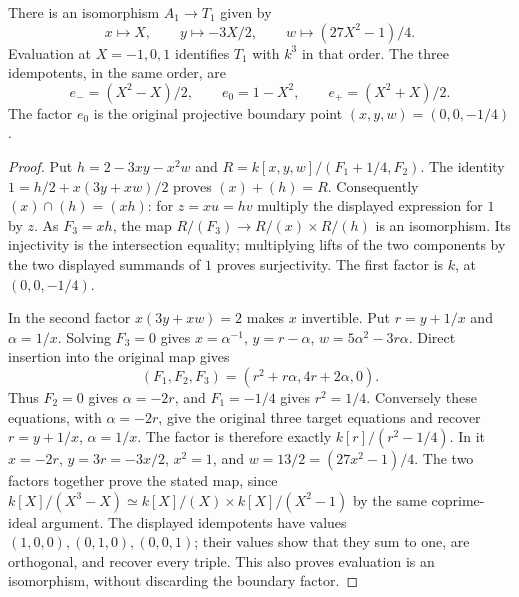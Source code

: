\begin{proposition}\label{prop:sv-full-fibre}
There is an isomorphism $A_1\longrightarrow T_1$ given by
\[
 x\longmapsto X,\qquad y\longmapsto-3X/2,\qquad
 w\longmapsto(27X^2-1)/4.
\]
Evaluation at $X=-1,0,1$ identifies $T_1$ with $k^3$ in that order.
The three idempotents, in the same order, are
\[
 e_-=(X^2-X)/2,\qquad e_0=1-X^2,\qquad e_+=(X^2+X)/2.
\]
The factor $e_0$ is the original projective boundary point
$(x,y,w)=(0,0,-1/4)$.
\end{proposition}
\begin{proof}
Put $h=2-3xy-x^2w$ and
$R=k[x,y,w]/(F_1+1/4,F_2)$. The identity
$1=h/2+x(3y+xw)/2$ proves $(x)+(h)=R$.
Consequently $(x)\cap(h)=(xh)$: for $z=xu=hv$ multiply the
displayed expression for $1$ by $z$. As $F_3=xh$, the map
$R/(F_3)\to R/(x)\times R/(h)$ is an isomorphism. Its injectivity
is the intersection equality; multiplying lifts of the two components
by the two displayed summands of $1$ proves surjectivity.
The first factor is $k$, at $(0,0,-1/4)$.

In the second factor $x(3y+xw)=2$ makes $x$ invertible. Put
$r=y+1/x$ and $\alpha=1/x$. Solving $F_3=0$ gives
$x=\alpha^{-1}$, $y=r-\alpha$,
$w=5\alpha^2-3r\alpha$. Direct insertion into the original map gives
\[
 (F_1,F_2,F_3)=(r^2+r\alpha,4r+2\alpha,0).
\]
Thus $F_2=0$ gives $\alpha=-2r$, and $F_1=-1/4$ gives
$r^2=1/4$. Conversely these equations, with
$\alpha=-2r$, give the original three target equations and recover
$r=y+1/x$, $\alpha=1/x$. The factor is therefore exactly
$k[r]/(r^2-1/4)$. In it $x=-2r$, $y=3r=-3x/2$,
$x^2=1$, and $w=13/2=(27x^2-1)/4$.
The two factors together prove the stated map, since
$k[X]/(X^3-X)\simeq k[X]/(X)\times k[X]/(X^2-1)$ by the
same coprime-ideal argument. The displayed idempotents have values
$(1,0,0),(0,1,0),(0,0,1)$; their values show that they sum to one,
are orthogonal, and recover every triple. This also proves evaluation
is an isomorphism, without discarding the boundary factor.
\end{proof}

